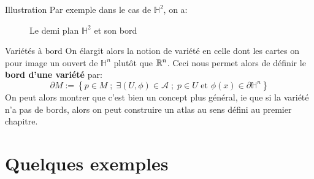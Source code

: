 \documentclass{beamer}
\begin{document}
        \begin{frame}{Illustration}
            Par exemple dans le cas de \( \mathbb{H}^2 \), on a:
            \begin{figure}[ht!]
               \centering
              \caption{Le demi plan \( \mathbb{H}^2 \) et son bord}
            \end{figure}
        \end{frame}
        \begin{frame}{Variétés à bord}
            On élargit alors la notion de variété en celle dont les cartes on pour image un ouvert de $\mathbb{H}^n$ plutôt que $\mathbb{R}^n$. Ceci nous permet alors de définir le \textbf{bord d'une variété} par:
            \[
                \partial M := \left\{ p \in M  \; ; \; \exists (U, \phi) \in \mathcal{A} \; ; \; p \in U \text{ et } \phi(x) \in \partial\mathbb{H}^n\right\}  
            \]
            On peut alors montrer que c'est bien un concept plus général, ie que si la variété n'a pas de bords, alors on peut construire un atlas au sens défini au premier chapitre.
        \end{frame}
    \section{Quelques exemples}
\end{document}
